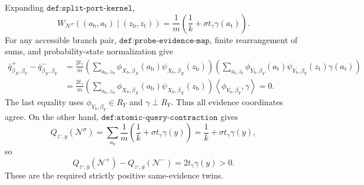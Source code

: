 Expanding \(\texttt{def:split-port-kernel}\),
\[
W_{\mathcal N^\sigma}((a_{\mathrm b},a_{\mathrm t})\mid(z_{\mathrm b},z_{\mathrm t}))
=\frac1m\left(\frac1k+\sigma t_\gamma\gamma(a_{\mathrm t})\right).
\]
For any accessible branch pair, \(\texttt{def:probe-evidence-map}\), finite rearrangement of sums, and probability-state normalization give
\[
\begin{aligned}
\bar q^+_{\beta_X,\beta_Y}-\bar q^-_{\beta_X,\beta_Y}
&=\frac{2t_\gamma}{m}
\left(\sum_{a_{\mathrm b},z_{\mathrm b}}
\phi_{X_{\mathrm b},\beta_X}(a_{\mathrm b})
\psi_{X_{\mathrm b},\beta_X}(z_{\mathrm b})\right)
\left(\sum_{a_{\mathrm t},z_{\mathrm t}}
\phi_{Y_{\mathrm b},\beta_Y}(a_{\mathrm t})
\psi_{Y_{\mathrm b},\beta_Y}(z_{\mathrm t})
\gamma(a_{\mathrm t})\right)\\
&=\frac{2t_\gamma}{m}
\left(\sum_{a_{\mathrm b},z_{\mathrm b}}
\phi_{X_{\mathrm b},\beta_X}(a_{\mathrm b})
\psi_{X_{\mathrm b},\beta_X}(z_{\mathrm b})\right)
\left\langle\phi_{Y_{\mathrm b},\beta_Y},\gamma\right\rangle
=0.
\end{aligned}
\]
The last equality uses \(\phi_{Y_{\mathrm b},\beta_Y}\in R_Y\) and \(\gamma\perp R_Y\).  Thus all evidence coordinates agree.  On the other hand, \(\texttt{def:atomic-query-contraction}\) gives
\[
Q_{z^{\circ},y}(\mathcal N^\sigma)
=\sum_{a_{\mathrm b}}\frac1m
\left(\frac1k+\sigma t_\gamma\gamma(y)\right)
=\frac1k+\sigma t_\gamma\gamma(y),
\]
so
\[
Q_{z^{\circ},y}(\mathcal N^+)-Q_{z^{\circ},y}(\mathcal N^-)
=2t_\gamma\gamma(y)>0.
\]
These are the required strictly positive same-evidence twins.